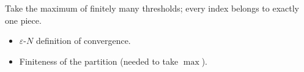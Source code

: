 \begin{remark*}
Take the maximum of finitely many thresholds; every index belongs to exactly one piece.
\end{remark*}

\begin{remark*}[Dependencies]
\begin{itemize}
  \item $\varepsilon$-$N$ definition of convergence.
  \item Finiteness of the partition (needed to take $\max$).
\end{itemize}
\end{remark*}
